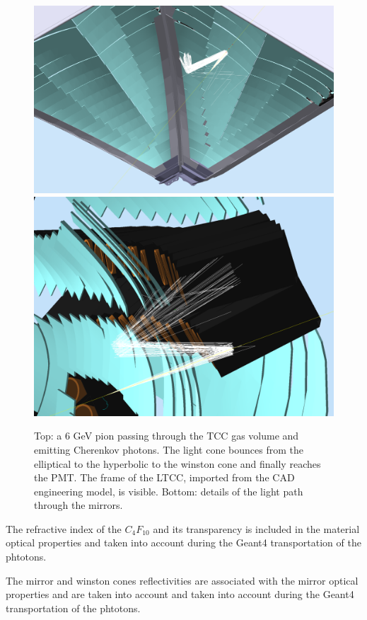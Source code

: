 \begin{figure}
	\centering
	\includegraphics[width=0.95\columnwidth,keepaspectratio]{img/ltccGeometry.png}
	\includegraphics[width=0.95\columnwidth,keepaspectratio]{img/ltccDetail.png}
	\caption{Top: a 6 GeV pion passing through the TCC gas volume and emitting Cherenkov photons. The light cone
            bounces from the elliptical to the hyperbolic to the winston cone and finally reaches the PMT. The
            frame of the LTCC, imported from the CAD engineering model, is visible.
            Bottom: details of the light path through the mirrors. }
	\label{fig:ltccGeometry}
\end{figure}

The refractive index of the $C_4F_10$ and its transparency is included in the material optical properties and taken
into account during the Geant4 transportation of the phtotons.

The mirror and winston cones reflectivities are associated with the mirror optical properties and are taken into
account and taken into account during the Geant4 transportation of the phtotons.

